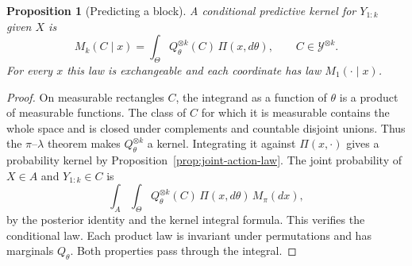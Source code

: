 \documentclass[11pt,oneside]{book}
\newtheorem{proposition}[theorem]{Proposition}
\theoremstyle{definition}
\theoremstyle{remark}
\begin{document}
\begin{proposition}[Predicting a block]
\label{prop:bayesian-predictive-block}
A conditional predictive kernel for $Y_{1:k}$ given $X$ is
\begin{equation}
M_k(C\mid x)=\int_\Theta Q_\theta^{\otimes k}(C)\,\Pi(x,d\theta),
\qquad C\in\mathcal Y^{\otimes k}.
\label{eq:bayesian-predictive-block}
\end{equation}
For every $x$ this law is exchangeable and each coordinate has law
$M_1(\cdot\mid x)$.
\end{proposition}
\begin{proof}
On measurable rectangles $C$, the integrand as a function of
$\theta$ is a product of measurable functions. The class of $C$
for which it is measurable contains the whole space and is closed
under complements and countable disjoint unions. Thus the
$\pi$--$\lambda$ theorem makes $Q_\theta^{\otimes k}$ a kernel.
Integrating it against $\Pi(x,\cdot)$ gives a probability kernel
by Proposition~\ref{prop:joint-action-law}. The joint probability
of $X\in A$ and $Y_{1:k}\in C$ is
\[
\int_A\int_\Theta Q_\theta^{\otimes k}(C)\,\Pi(x,d\theta)\,M_\pi(dx),
\]
by the posterior identity and the kernel integral formula.
This verifies the conditional law. Each product law is invariant
under permutations and has marginals $Q_\theta$. Both properties
pass through the integral.
\end{proof}
\end{document}
